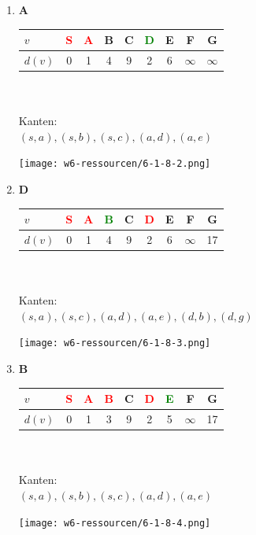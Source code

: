 \documentclass{article}
\begin{document}
\begin{enumerate}
	\item \textbf{A}\\
	\begin{minipage}[t]{0.48\textwidth}
		\begin{tabular}{l||c|c|c|c|c|c|c|c}
			$v$		&	\textcolor{red}{S}	&	\textcolor{red}{A}	&	B	&	C	&	\textcolor{green}{D}	&	E	&	F	&	G	\\	\hline
			$d(v)$	&	0					&	1					&	4	&	9	&	2	&	6	&	$\infty$	&	$\infty$
		\end{tabular}\\\\
		Kanten:\\
		$(s,a),(s,b),(s,c),(a,d),(a,e)$
	\end{minipage}
	\begin{minipage}[t]{0.48\textwidth}
		\texttt{[image: w6-ressourcen/6-1-8-2.png]}
	\end{minipage}
	
	\item \textbf{D}\\
	\begin{minipage}[t]{0.48\textwidth}
		\begin{tabular}{l||c|c|c|c|c|c|c|c}
			$v$		&	\textcolor{red}{S}	&	\textcolor{red}{A}	&	\textcolor{green}{B}	&	C	&	\textcolor{red}{D}&	E	&	F	&	G	\\	\hline
			$d(v)$	&	0	&	1	&	4	&	9	&	2	&	6	&	$\infty$	&	17
		\end{tabular}\\\\
		Kanten:\\
		$(s,a),(s,c),(a,d),(a,e),(d,b),(d,g)$
	\end{minipage}
	\begin{minipage}[t]{0.48\textwidth}
		\texttt{[image: w6-ressourcen/6-1-8-3.png]}
	\end{minipage}
	
	\item \textbf{B}\\
	\begin{minipage}[t]{0.48\textwidth}
		\begin{tabular}{l||c|c|c|c|c|c|c|c}
			$v$		&	\textcolor{red}{S}	&	\textcolor{red}{A}	&	\textcolor{red}{B}	&	C	&	\textcolor{red}{D}	&	\textcolor{green}{E}	&	F	&	G	\\	\hline
			$d(v)$	&	0	&	1	&	3	&	9	&	2	&	5	&	$\infty$	&	17
		\end{tabular}\\\\
		Kanten:\\
		$(s,a),(s,b),(s,c),(a,d),(a,e)$
	\end{minipage}
	\begin{minipage}[t]{0.48\textwidth}
		\texttt{[image: w6-ressourcen/6-1-8-4.png]}
	\end{minipage}
	

\end{enumerate}
\end{document}
